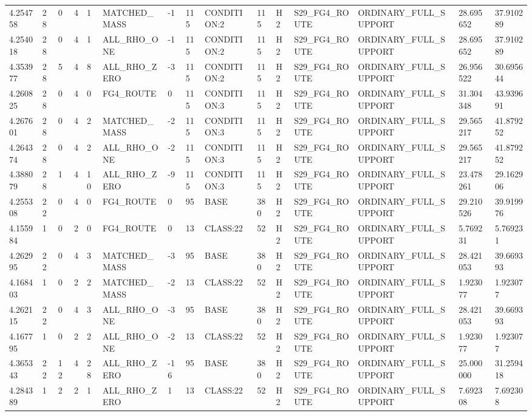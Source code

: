 \begin{tabular}{lllllllllllllll}
4.254758 & 28 & 0 & 4 & 1 & MATCHED\_MASS & -1 & 115 & CONDITION:2 & 115 & H2 & S29\_FG4\_ROUTE & ORDINARY\_FULL\_SUPPORT & 28.695652 & 37.910289 \\
4.254018 & 28 & 0 & 4 & 1 & ALL\_RHO\_ONE & -1 & 115 & CONDITION:2 & 115 & H2 & S29\_FG4\_ROUTE & ORDINARY\_FULL\_SUPPORT & 28.695652 & 37.910289 \\
4.353977 & 28 & 5 & 4 & 8 & ALL\_RHO\_ZERO & -3 & 115 & CONDITION:2 & 115 & H2 & S29\_FG4\_ROUTE & ORDINARY\_FULL\_SUPPORT & 26.956522 & 30.695644 \\
4.260825 & 28 & 0 & 4 & 0 & FG4\_ROUTE & 0 & 115 & CONDITION:3 & 115 & H2 & S29\_FG4\_ROUTE & ORDINARY\_FULL\_SUPPORT & 31.304348 & 43.939691 \\
4.267601 & 28 & 0 & 4 & 2 & MATCHED\_MASS & -2 & 115 & CONDITION:3 & 115 & H2 & S29\_FG4\_ROUTE & ORDINARY\_FULL\_SUPPORT & 29.565217 & 41.879252 \\
4.264374 & 28 & 0 & 4 & 2 & ALL\_RHO\_ONE & -2 & 115 & CONDITION:3 & 115 & H2 & S29\_FG4\_ROUTE & ORDINARY\_FULL\_SUPPORT & 29.565217 & 41.879252 \\
4.388079 & 28 & 1 & 4 & 10 & ALL\_RHO\_ZERO & -9 & 115 & CONDITION:3 & 115 & H2 & S29\_FG4\_ROUTE & ORDINARY\_FULL\_SUPPORT & 23.478261 & 29.162906 \\
4.255308 & 22 & 0 & 4 & 0 & FG4\_ROUTE & 0 & 95 & BASE & 380 & H2 & S29\_FG4\_ROUTE & ORDINARY\_FULL\_SUPPORT & 29.210526 & 39.919976 \\
4.155984 & 1 & 0 & 2 & 0 & FG4\_ROUTE & 0 & 13 & CLASS:22 & 52 & H2 & S29\_FG4\_ROUTE & ORDINARY\_FULL\_SUPPORT & 5.769231 & 5.769231 \\
4.262995 & 22 & 0 & 4 & 3 & MATCHED\_MASS & -3 & 95 & BASE & 380 & H2 & S29\_FG4\_ROUTE & ORDINARY\_FULL\_SUPPORT & 28.421053 & 39.669393 \\
4.168403 & 1 & 0 & 2 & 2 & MATCHED\_MASS & -2 & 13 & CLASS:22 & 52 & H2 & S29\_FG4\_ROUTE & ORDINARY\_FULL\_SUPPORT & 1.923077 & 1.923077 \\
4.262115 & 22 & 0 & 4 & 3 & ALL\_RHO\_ONE & -3 & 95 & BASE & 380 & H2 & S29\_FG4\_ROUTE & ORDINARY\_FULL\_SUPPORT & 28.421053 & 39.669393 \\
4.167795 & 1 & 0 & 2 & 2 & ALL\_RHO\_ONE & -2 & 13 & CLASS:22 & 52 & H2 & S29\_FG4\_ROUTE & ORDINARY\_FULL\_SUPPORT & 1.923077 & 1.923077 \\
4.365343 & 22 & 12 & 4 & 28 & ALL\_RHO\_ZERO & -16 & 95 & BASE & 380 & H2 & S29\_FG4\_ROUTE & ORDINARY\_FULL\_SUPPORT & 25.000000 & 31.259418 \\
4.284389 & 1 & 2 & 2 & 1 & ALL\_RHO\_ZERO & 1 & 13 & CLASS:22 & 52 & H2 & S29\_FG4\_ROUTE & ORDINARY\_FULL\_SUPPORT & 7.692308 & 7.692308 \\

\end{tabular}
